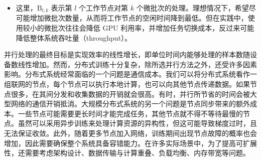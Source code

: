    \vspace{0.5em}
    \begin{center}
    \begingroup
    \endgroup
    \end{center}
    \vspace{0.5em}

\begin{itemize}
\item[] 这里，$\mathrm{B}_{l,k}$ 表示第 $l$ 个工作节点对第 $k$ 个微批次的处理。理想情况下，希望尽可能增加微批次数量，从而将工作节点的空闲时间降到最低。但在实践中，使用较小的微批次往往会降低 GPU 利用率，并增加任务切换成本，反过来可能降低整体系统吞吐量（throughput）。
\end{itemize}
\vspace{0.5em}

并行处理的最终目标是实现效率的线性增长，即单位时间内能够处理的样本数随设备数线性增加。然而，分布式训练十分复杂，除所选并行方法之外，还受许多因素影响。分布式系统经常面临的一个问题是通信成本。我们可以将分布式系统看作一组联网的节点，每个节点可以执行本地计算，也可以向其他节点传递数据。如果节点很多，在其间分发和收集数据的开销就会很高。有时，并行所节省的时间会被大型网络的通信开销抵消。大规模分布式系统的另一个问题是节点同步带来的额外成本。一些节点可能需要更长时间才能完成任务，其他节点就不得不等待最慢的节点。虽然可以采用异步训练来处理计算资源的异构性，但这可能导致梯度过时，且无法保证收敛。此外，随着更多节点加入网络，训练期间出现节点故障的概率也会增加，因此需要确保整个系统具备容错能力。在许多实际场景中，为了提高可扩展性，还需要考虑架构设计、数据传输与计算重叠、负载均衡、内存带宽等问题。

